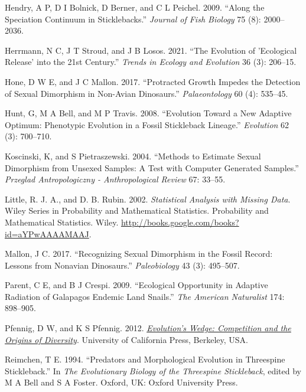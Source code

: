 \documentclass[
  12pt,
]{article}
\newlength{\cslhangindent}
\newlength{\cslentryspacingunit} %
\newenvironment{CSLReferences}[2] %
 {%
  \setlength{\parindent}{0pt}
  \ifodd #1
  \let\oldpar\par
  \def\par{\hangindent=\cslhangindent\oldpar}
  \fi
  \setlength{\parskip}{#2\cslentryspacingunit}
 }%
 {}
\begin{document}
\begin{CSLReferences}{1}{0}
\leavevmode{}%
Hendry, A P, D I Bolnick, D Berner, and C L Peichel. 2009. {``Along the
Speciation Continuum in Sticklebacks.''} \emph{Journal of Fish Biology}
75 (8): 2000--2036.

\leavevmode{}%
Herrmann, N C, J T Stroud, and J B Losos. 2021. {``The Evolution of
'Ecological Release' into the 21st Century.''} \emph{Trends in Ecology
and Evolution} 36 (3): 206--15.

\leavevmode{}%
Hone, D W E, and J C Mallon. 2017. {``Protracted Growth Impedes the
Detection of Sexual Dimorphism in Non-Avian Dinosaurs.''}
\emph{Palaeontology} 60 (4): 535--45.

\leavevmode{}%
Hunt, G, M A Bell, and M P Travis. 2008. {``Evolution Toward a New
Adaptive Optimum: Phenotypic Evolution in a Fossil Stickleback
Lineage.''} \emph{Evolution} 62 (3): 700--710.

\leavevmode{}%
Koscinski, K, and S Pietraszewski. 2004. {``Methods to Estimate Sexual
Dimorphism from Unsexed Samples: A Test with Computer Generated
Samples.''} \emph{Przeglad Antropologiczny - Anthropological Review} 67:
33--55.

\leavevmode{}%
Little, R. J. A., and D. B. Rubin. 2002. \emph{Statistical Analysis with
Missing Data}. Wiley Series in Probability and Mathematical Statistics.
Probability and Mathematical Statistics. Wiley.
\url{http://books.google.com/books?id=aYPwAAAAMAAJ}.

\leavevmode{}%
Mallon, J C. 2017. {``Recognizing Sexual Dimorphism in the Fossil
Record: Lessons from Nonavian Dinosaurs.''} \emph{Paleobiology} 43 (3):
495--507.

\leavevmode{}%
Parent, C E, and B J Crespi. 2009. {``Ecological Opportunity in Adaptive
Radiation of Galapagos Endemic Land Snails.''} \emph{The American
Naturalist} 174: 898--905.

\leavevmode{}%
Pfennig, D W, and K S Pfennig. 2012. \emph{\href{}{Evolution's Wedge:
Competition and the Origins of Diversity}}. University of California
Press, Berkeley, USA.

\leavevmode{}%
Reimchen, T E. 1994. {``Predators and Morphological Evolution in
Threespine Stickleback.''} In \emph{The Evolutionary Biology of the
Threespine Stickleback}, edited by M A Bell and S A Foster. Oxford, UK:
Oxford University Press.


\end{CSLReferences}
\end{document}

